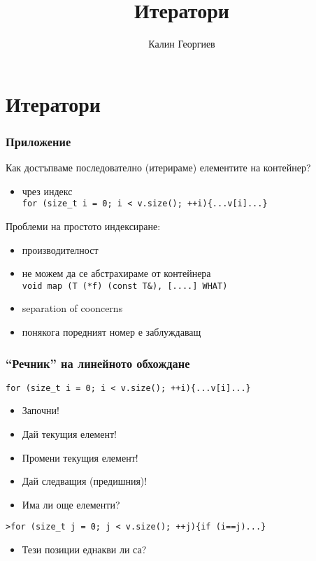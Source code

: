 \documentclass{beamer}
\begin{document}
\title[Обектно-ориентирано програмиране]{Итератори} 
\author{Калин Георгиев} 
\frame{\titlepage} 


\section{Итератори} 


\begin{frame}[fragile]
  \frametitle{Приложение}

  Как достъпваме последователно (итерираме) елементите на контейнер?
  \begin{itemize}
    \item чрез индекс \\
          \verb#for (size_t i = 0; i < v.size(); ++i){...v[i]...}#
  \end{itemize}
  Проблеми на простото индексиране:
  \begin{itemize}
    \item производителност
    \item не можем да се абстрахираме от контейнера\\
    \verb#void map (T (*f) (const T&), [....] WHAT)#
    \item separation of cooncerns
    \item понякога поредният номер е заблуждаващ
  \end{itemize}
  
  
  \end{frame}

  
  \begin{frame}[fragile]
    \frametitle{``Речник'' на линейното обхождане}
  
    \verb#for (size_t i = 0; i < v.size(); ++i){...v[i]...}#

    \begin{itemize}
      \item Започни!
      \item Дай текущия елемент!
      \item Промени текущия елемент!
      \item Дай следващия (предишния)!
      \item Има ли още елементи?
    \end{itemize}
    \verb#>for (size_t j = 0; j < v.size(); ++j){if (i==j)...}#   
    \begin{itemize}
      \item Тези позиции еднакви ли са?
    \end{itemize}
  \end{frame}
  
\end{document}
